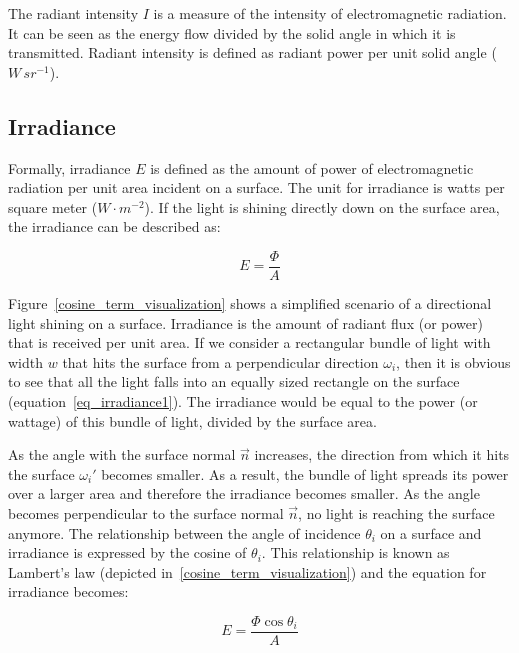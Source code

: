 \documentclass[11pt,a4paper]{report}
\begin{document}
The radiant intensity $I$ is a measure of the intensity of electromagnetic radiation. It can be seen as the energy flow divided by the solid angle in which it is transmitted. Radiant intensity is defined as radiant power per unit solid angle ($W \, sr^{-1}$).

\subsection{Irradiance}
\label{radiance_irradiance}

Formally, irradiance $E$ is defined as the amount of power of electromagnetic radiation per unit area incident on a surface. The unit for irradiance is watts per square meter ($W \cdot m^{-2}$). If the light is shining directly down on the surface area, the irradiance can be described as:

\begin{equation}
E = \frac{\Phi}{A}
\label{eq_irradiance1}
\end{equation} 

Figure~\ref{cosine_term_visualization} shows a simplified scenario of a directional light shining on a surface. Irradiance is the amount of radiant flux (or power) that is received per unit area. If we consider a rectangular bundle of light with width $w$ that hits the surface from a perpendicular direction $\omega_i$, then it is obvious to see that all the light falls into an equally sized rectangle on the surface (equation~\ref{eq_irradiance1}). The irradiance would be equal to the power (or wattage) of this bundle of light, divided by the surface area.

As the angle with the surface normal $\vec{n}$ increases, the direction from which it hits the surface $\omega_i'$ becomes smaller. As a result, the bundle of light spreads its power over a larger area and therefore the irradiance becomes smaller. As the angle becomes perpendicular to the surface normal $\vec{n}$, no light is reaching the surface anymore. The relationship between the angle of incidence $\theta_i$ on a surface and irradiance is expressed by the cosine of $\theta_i$. This relationship is known as Lambert's law (depicted in~\ref{cosine_term_visualization}) and the equation for irradiance becomes:

\begin{equation}
E = \frac{\Phi \cos \theta_i}{A}
\label{eq_irradiance1}
\end{equation}
\end{document}
